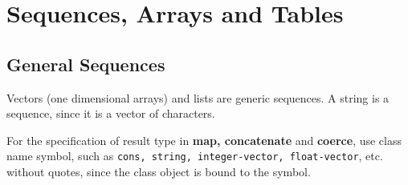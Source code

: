\section{Sequences, Arrays and Tables}

\subsection{General Sequences}

Vectors (one dimensional arrays) and lists are generic sequences.
A string is a sequence, since it is a vector of characters.

For the specification of result type in
{\bf map, concatenate} and {\bf coerce},
use class name symbol, such as {\tt cons, string, integer-vector, float-vector},
etc. without quotes, 
since the class object is bound to the symbol.

